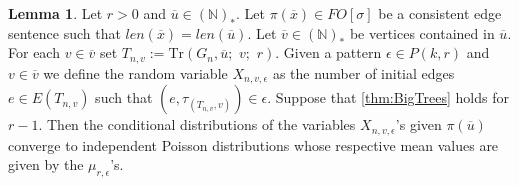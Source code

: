 \documentclass[12pt,notitlepage,a4paper]{article}
\theoremstyle{definition}
\newtheorem{lemma}{Lemma}[section]
\newcommand{\N}{\mathbb{N}}
\newcommand{\Tr}{\mathrm{Tr}}
\begin{document}
\begin{lemma}\label{lem:poisedges}
	Let $r>0$ and $\overline{u}\in (\N)_*$.
	Let $\pi(\overline{x})\in FO[\sigma]$ be a consistent
	edge sentence such that 
	$len(\overline{x})=len(\overline{u})$.
	Let $\overline{v}\in (\N)_*$ be vertices contained
	in $\overline{u}$. For each $v\in \overline{v}$
	set $T_{n,v}:= \Tr\left(G_n, \overline{u};\,\,v;\,\,r\right)$.
	Given a pattern $\epsilon\in P(k,r)$ and $v\in \overline{v}$
	we define the random variable $X_{n,v,\epsilon}$ as
	the number of initial edges $e\in E(T_{n,v})$ such 
	that $(e,\tau_{(T_{n,v},v)})\in \epsilon$. Suppose that
	\cref{thm:BigTrees} holds for $r-1$. Then the conditional 
	distributions of the variables $X_{n,v,\epsilon}$'s given
	$\pi(\overline{u})$ converge to independent Poisson distributions
	whose respective mean values are given by the $\mu_{r,\epsilon}$'s. 
\end{lemma}
\end{document}
